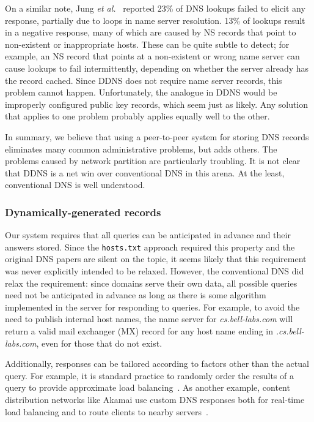 On a similar note, Jung {\it et al.}~\cite{dnscache:sigcommimw01} 
reported 23\% of 
DNS lookups failed to elicit any response, partially due to loops 
in name server resolution. 13\% of lookups result in a negative 
response, many of which are caused by NS records that point to 
non-existent or inappropriate hosts.
These can be quite subtle to detect; for example, an NS record that points
at a non-existent or wrong name server can cause lookups to fail
intermittently, depending on whether the server already has the 
record cached.
Since DDNS does not require name server records, this problem cannot happen.
Unfortunately, the analogue in DDNS would be improperly
configured public key records, which seem just as likely.
Any solution that applies to one problem
probably applies equally well to the other.

In summary, we believe that using a peer-to-peer system for
storing DNS records eliminates many common administrative
problems, but adds others.
The problems caused by network partition are particularly troubling.
It is not clear that DDNS is a net win over conventional DNS in
this arena.  At the least, conventional DNS is well understood.

\subsubsection{Dynamically-generated records}

Our system requires that all queries
can be anticipated in advance and their answers stored.
Since the {\tt hosts.txt} approach required this property
and the original DNS papers are silent on the topic,
it seems likely that this requirement was never 
explicitly intended to be relaxed.
However, the conventional DNS did relax the requirement:
since domains serve their own data, all possible queries need 
not be anticipated in advance as long as there is some algorithm
implemented in the server for responding to queries.
For example, to avoid the need to publish internal host names,
the name server for
{\em cs.bell-labs.com} will return a valid mail exchanger (MX) record
for any host name ending in {\em .cs.bell-labs.com}, even
for those that do not exist.

Additionally, responses can be tailored according to factors
other than the actual query.
For example, it is standard practice to randomly order the results
of a query to provide approximate load balancing~\cite{dns-load:rfc}.
As another example, content distribution networks like Akamai
use custom DNS responses both for real-time load balancing and
to route clients to nearby servers~\cite{akamai.rev.eng}.


